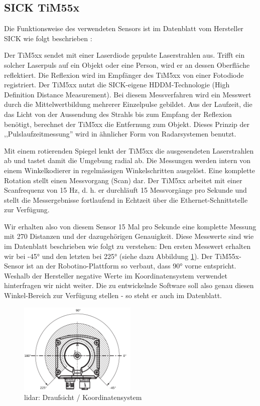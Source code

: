\subsection{SICK TiM55x}
\label{chap:tim55x}
Die Funktionsweise des verwendeten Sensors ist im Datenblatt vom Hersteller SICK wie folgt beschrieben \cite{tim55x-techinfo}:
\begin{formal}
Der TiM5xx sendet mit einer Laserdiode gepulste Laserstrahlen aus. Trifft ein solcher Laserpuls auf ein Objekt oder eine Person, wird er an dessen Oberfläche reflektiert. Die Reflexion wird im Empfänger des TiM5xx von einer Fotodiode registriert. Der TiM5xx nutzt die SICK-eigene HDDM-Technologie (High Definition Distance Measurement). Bei diesem Messverfahren wird ein Messwert durch die Mittelwertbildung mehrerer Einzelpulse gebildet. Aus der Laufzeit, die das Licht von der Aussendung des Strahls bis zum Empfang der Reflexion benötigt, berechnet der TiM5xx die Entfernung zum Objekt. Dieses Prinzip der ,,Pulslaufzeitmessung'' wird in ähnlicher Form von Radarsystemen benutzt.

Mit einem rotierenden Spiegel lenkt der TiM5xx die ausgesendeten Laserstrahlen ab und tastet damit die Umgebung radial ab. Die Messungen werden intern von einem Winkelkodierer in regelmässigen Winkelschritten ausgelöst. Eine komplette Rotation stellt einen Messvorgang (Scan) dar. Der TiM5xx arbeitet mit einer Scanfrequenz von 15 Hz, d. h. er durchläuft 15 Messvorgänge pro Sekunde und stellt die Messergebnisse fortlaufend in Echtzeit über die Ethernet-Schnittstelle zur Verfügung.
\end{formal}

Wir erhalten also von diesem Sensor 15 Mal pro Sekunde eine komplette Messung mit 270 Distanzen und der dazugehörigen Genauigkeit. Diese Messwerte sind wie im Datenblatt beschrieben wie folgt zu verstehen: Den ersten Messwert erhalten wir bei -45° und den letzten bei 225° (siehe dazu Abbildung \ref{fig:lidar}). Der TiM55x-Sensor ist an der Robotino-Plattform so verbaut, dass 90° vorne entspricht. Weshalb der Hersteller negative Werte im Koordinatensystem verwendet hinterfragen wir nicht weiter. Die zu entwickelnde Software soll also genau diesen Winkel-Bereich zur Verfügung stellen - so steht er auch im Datenblatt.
\begin{figure}[H]
	\centering
	\includegraphics[width=0.5\textwidth]{img/lidar-coordinate.png}
	\caption{\acrshort{lidar}: Draufsicht / Koordinatensystem}
	\label{fig:lidar}
\end{figure}
